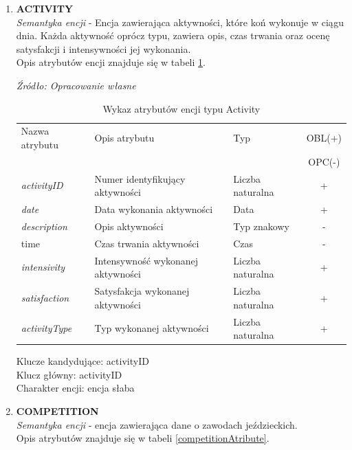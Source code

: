 \documentclass[12pt,oneside]{report}
\begin{document}
\begin{enumerate}[start=1,label={\bfseries ENC\textbackslash0\arabic*}]
	\item \textbf{ACTIVITY} \\
	\textit{Semantyka encji} - Encja zawierająca aktywności, które koń wykonuje w ciągu dnia. Każda aktywność oprócz typu, zawiera opis, czas trwania oraz ocenę satysfakcji i intensywności jej wykonania.
	\\
	Opis atrybutów encji znajduje się w tabeli \ref{ActivityAtribute}.
	
	\begin{table}[H]
		\caption{Wykaz atrybutów encji typu Activity }
		\textit{Źródło: Opracowanie własne}
		\label{ActivityAtribute}
		\centering
		\begin{tabular}{|l|l|l|c|}
			\hline
			Nazwa atrybutu & Opis atrybutu & Typ & OBL(+) \\
			& & &  OPC(-) \\
			\hline
			\textit{activityID} & Numer identyfikujący aktywności & Liczba naturalna & + \\
			\hline
			\textit{date} & Data wykonania aktywności & Data & + \\
			\hline
			\textit{description} & Opis aktywności & Typ znakowy & - \\
			\hline
			time &  Czas trwania aktywności & Czas & - \\
			\hline
			\textit{intensivity} & Intensywność wykonanej aktywności & Liczba naturalna & + \\
			\hline
			\textit{satisfaction} & Satysfakcja wykonanej aktywności & Liczba naturalna & + \\
			\hline
			\textit{activityType} &  Typ wykonanej aktywności & Liczba naturalna & + \\
			\hline
		\end{tabular}
	\end{table}
	Klucze kandydujące: activityID \\
	Klucz główny: activityID \\
	Charakter encji: encja słaba \\
	\item \textbf{COMPETITION}\\
	\textit{Semantyka encji} - encja zawierająca dane o zawodach jeździeckich. 
	\\
	Opis atrybutów znajduje się w tabeli \ref{competitionAtribute}.
	

\end{enumerate}
\end{document}
